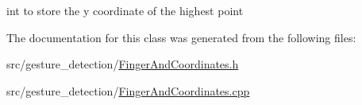 int to store the y coordinate of the highest point 



The documentation for this class was generated from the following files\+:\begin{DoxyCompactItemize}
\item 
src/gesture\+\_\+detection/\hyperlink{FingerAndCoordinates_8h}{Finger\+And\+Coordinates.\+h}\item 
src/gesture\+\_\+detection/\hyperlink{FingerAndCoordinates_8cpp}{Finger\+And\+Coordinates.\+cpp}\end{DoxyCompactItemize}
